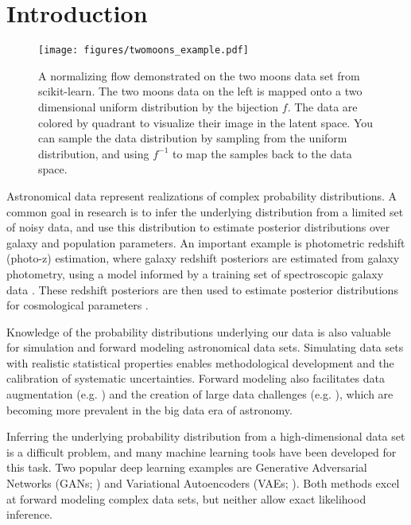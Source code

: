 \documentclass[twocolumn,twocolappendix]{aastex631}
\begin{document}
\section{Introduction}
\label{sec:intro}

\begin{figure*}[t]
    \begin{centering}
        \texttt{[image: figures/twomoons\_example.pdf]}
        \caption{
            A normalizing flow demonstrated on the two moons data set from scikit-learn.
            The two moons data on the left is mapped onto a two dimensional uniform distribution by the bijection $f$.
            The data are colored by quadrant to visualize their image in the latent space.
            You can sample the data distribution by sampling from the uniform distribution, and using $f^{-1}$ to map the samples back to the data space.
        }
        \label{fig:two-moons}
    \end{centering}
\end{figure*}

Astronomical data represent realizations of complex probability distributions.
A common goal in research is to infer the underlying distribution from a limited set of noisy data, and use this distribution to estimate posterior distributions over galaxy and population parameters.
An important example is photometric redshift (photo-z) estimation, where galaxy redshift posteriors are estimated from galaxy photometry, using a model informed by a training set of spectroscopic galaxy data \citep{newman2022}.
These redshift posteriors are then used to estimate posterior distributions for cosmological parameters \citep{descSRD}.

Knowledge of the probability distributions underlying our data is also valuable for simulation and forward modeling astronomical data sets.
Simulating data sets with realistic statistical properties enables methodological development and the calibration of systematic uncertainties.
Forward modeling also facilitates data augmentation (e.g. \citealt{lokken2022}) and the creation of large data challenges (e.g. \citealt{kessler2019, dc2, cosmodc2}), which are becoming more prevalent in the big data era of astronomy.

Inferring the underlying probability distribution from a high-dimensional data set is a difficult problem, and many machine learning tools have been developed for this task.
Two popular deep learning examples are Generative Adversarial Networks (GANs; \citealt{goodfellow2014}) and Variational Autoencoders (VAEs; \citealt{kingma2014}).
Both methods excel at forward modeling complex data sets, but neither allow exact likelihood inference.
\end{document}
